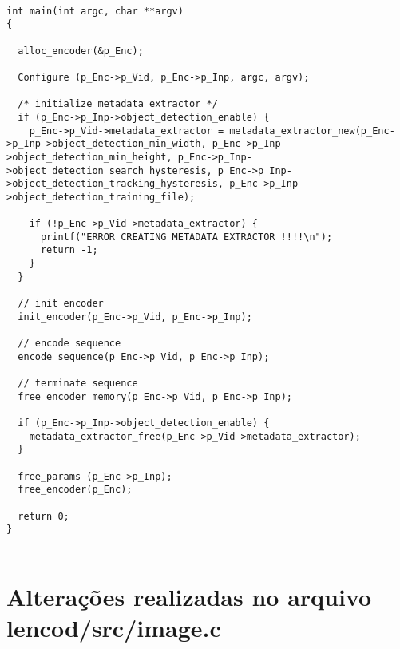 \begin{lstlisting}

int main(int argc, char **argv)
{

  alloc_encoder(&p_Enc);

  Configure (p_Enc->p_Vid, p_Enc->p_Inp, argc, argv);

  /* initialize metadata extractor */
  if (p_Enc->p_Inp->object_detection_enable) {
    p_Enc->p_Vid->metadata_extractor = metadata_extractor_new(p_Enc->p_Inp->object_detection_min_width, p_Enc->p_Inp->object_detection_min_height, p_Enc->p_Inp->object_detection_search_hysteresis, p_Enc->p_Inp->object_detection_tracking_hysteresis, p_Enc->p_Inp->object_detection_training_file);

    if (!p_Enc->p_Vid->metadata_extractor) {
      printf("ERROR CREATING METADATA EXTRACTOR !!!!\n");
      return -1;
    }
  }

  // init encoder
  init_encoder(p_Enc->p_Vid, p_Enc->p_Inp);

  // encode sequence
  encode_sequence(p_Enc->p_Vid, p_Enc->p_Inp);

  // terminate sequence
  free_encoder_memory(p_Enc->p_Vid, p_Enc->p_Inp);

  if (p_Enc->p_Inp->object_detection_enable) {
    metadata_extractor_free(p_Enc->p_Vid->metadata_extractor);
  }

  free_params (p_Enc->p_Inp);
  free_encoder(p_Enc);

  return 0;
}


\end{lstlisting}


\section{Alterações realizadas no arquivo lencod/src/image.c}

